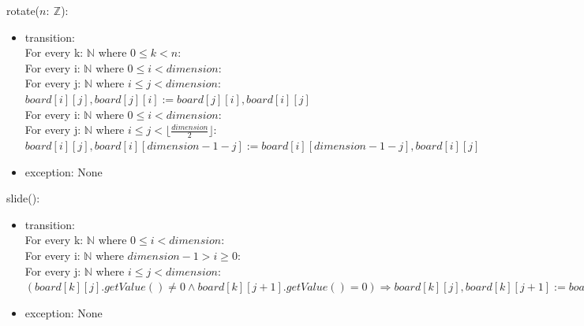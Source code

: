 \documentclass[12pt]{article}
\begin{document}
\noindent rotate($n:\ \mathbb{Z}$):
\begin{itemize}
  \item transition: \\
        \noindent For every k: $\mathbb{N}$ where $0 \le k < n$:                                                         \\
        \noindent\hspace*{0.5cm} For every i: $\mathbb{N}$ where $0 \le i < dimension$:                                  \\
        \noindent\hspace*{1cm} For every j: $\mathbb{N}$ where $i \le j < dimension$:                                    \\
        \noindent\hspace*{1.5cm} $board[i][j], board[j][i] := board[j][i], board[i][j]$                                  \\
        \noindent\hspace*{0.5cm}For every i: $\mathbb{N}$ where $0 \le i < dimension$:                                   \\
        \noindent\hspace*{1cm} For every j: $\mathbb{N}$ where $i \le j < \lfloor \frac{dimension}{2} \rfloor$:          \\
        \noindent\hspace*{1.5cm} $board[i][j],  board[i][dimension - 1 - j] := board[i][dimension - 1 - j], board[i][j]$
  \item exception: None
\end{itemize}

\noindent slide():
\begin{itemize}
  \item transition:\\
        \noindent For every k: $\mathbb{N}$ where $0 \le i < dimension$: \\
        \noindent\hspace*{0.5cm} For every i: $\mathbb{N}$ where $dimension - 1 > i \ge 0$: \\
        \noindent\hspace*{1cm} For every j: $\mathbb{N}$ where $i \le j < dimension$: \\
        \noindent\hspace*{1.5cm} $(board[k][j].getValue() \ne 0 \wedge board[k][j + 1].getValue() = 0) \Rightarrow board[k][j], board[k][j+1] := board[k][j+1], board[k][j]$
  \item exception: None
\end{itemize}
\end{document}
